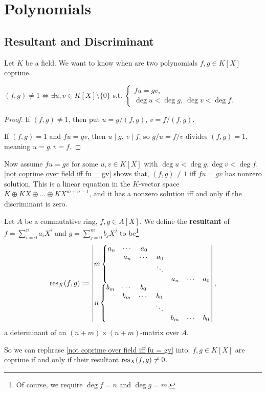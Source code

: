\section{Polynomials}

\subsection{Resultant and Discriminant}
Let $K$ be a field.
We want to know when are two polynomials $f, g\in K[X]$ coprime.
\begin{lemma}\label{not coprime over field iff fu = gv}
    $(f, g)\ne 1\iff \exists u, v\in K[X]\setminus \{0\}$ s.t. \(\begin{cases}
        fu = gv,\\ 
        \deg u <\deg g,\ \deg v < \deg f.
    \end{cases}\)
\end{lemma}
\begin{proof}
    If $(f, g) \ne 1$, then put $u = g/(f, g)$, $v = f/(f, g)$.

    If $(f, g) = 1$ and $fu = gv$, then $u\mid g$, $v\mid f$, so $g/u = f/v$ divides $(f, g) = 1$,
    meaning $u = g, v = f$.
\end{proof}

Now assume $fu = gv$ for some $u, v\in K[X]$ with $\deg u  < \deg g, \deg v < \deg f$.
\cref{not coprime over field iff fu = gv} shows that, $(f, g)\ne 1$ iff $fu = gv$ has nonzero solution. This is a linear equation in the $K$-vector space $K\oplus KX\oplus\dots\oplus KX^{m+n-1}$, and it has a nonzero solution iff and only if the discriminant is zero.
\begin{definition}
    Let $A$ be a commutative ring, $f, g\in A[X]$.
    We define the \textbf{resultant} of $f = \sum_{i=0}^{n}a_iX^i$ and $g = \sum_{j = 0}^m b_jX^j$ to be\footnote{Of course, we require $\deg f = n$ and $\deg g = m$.} \[\operatorname{res}_X(f, g) := 
\begin{vmatrix}
    m\left\{\begin{matrix}
        a_n & \cdots & a_0 &  &  &  & \\
         & a_n & \cdots &a_0 &  &  & \\ 
         & & & \ddots & & & \\ 
         & &  &  & a_n & \cdots & a_0
    \end{matrix}\right.\\
    n\left\{\begin{matrix}
        b_m & \cdots & b_0 &  &  &  & \\
         & b_m & \cdots &b_0 &  &  & \\ 
         & & & \ddots & & & \\ 
         & &  &  & b_m & \cdots & b_0
    \end{matrix}\right.
\end{vmatrix},\]
    a determinant of an $(n + m)\times (n + m)$-matrix over $A$.
\end{definition}
So we can rephrase \cref{not coprime over field iff fu = gv} into:
$f, g\in K[X]$ are coprime if and only if their resultant $\operatorname{res}_X(f, g) \ne 0$.

